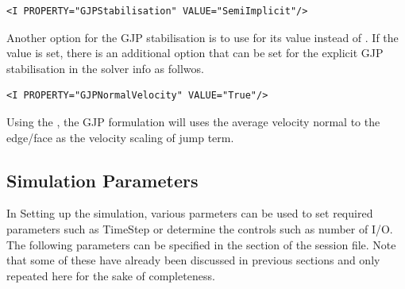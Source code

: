 \begin{lstlisting}[style=XMLStyle]
<I PROPERTY="GJPStabilisation" VALUE="SemiImplicit"/>
\end{lstlisting}

Another option for the GJP stabilisation is to use  for its value
instead of . If the  value is set, there is 
an additional option that can be set for the explicit GJP stabilisation in the 
solver info as follwos.

\begin{lstlisting}[style=XMLStyle]
<I PROPERTY="GJPNormalVelocity" VALUE="True"/>
\end{lstlisting}
Using the , the GJP formulation  will uses the average
velocity normal to the edge/face as the velocity scaling of jump term. 

\subsection{Simulation Parameters}
In Setting up the simulation, various parmeters can be used to set required 
parameters such as TimeStep or determine the controls such as number of I/O.
The following parameters can be specified in the  section of
the session file. Note that some of these have already been discussed in previous
sections and only repeated here for the sake of completeness.


